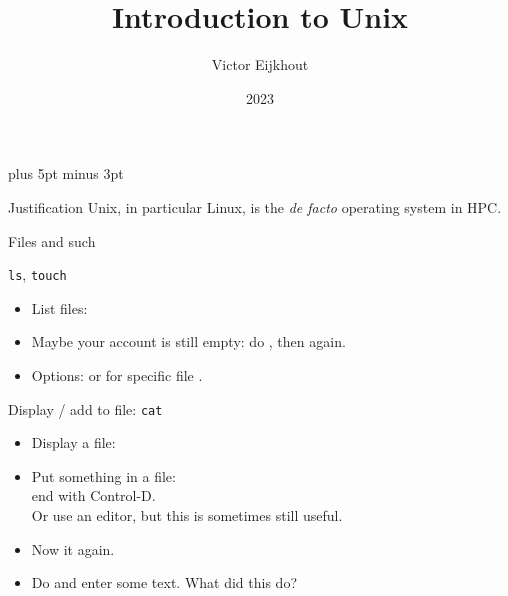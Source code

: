\documentclass[11pt,headernav]{beamer}
\begin{document}
\parskip=10pt plus 5pt minus 3pt

\title{Introduction to Unix}
\author{Victor Eijkhout}
\date{2023}

\begin{frame}
  \titlepage
\end{frame}

\tocslide

\begin{numberedframe}{Justification}
  Unix, in particular Linux, is the \textsl{de facto}
  operating system in \ac{HPC}.
\end{numberedframe}

 {Files and such}

\begin{numberedframe}{\texttt{ls}, \texttt{touch}}
  \label{sl-lnx:ls}
  \begin{itemize}
  \item List files: 
  \item Maybe your account is still empty: do ,
    then  again.
  \item Options:  or for specific file .
  \end{itemize}
\end{numberedframe}



\begin{numberedframe}{Display / add to file: \texttt{cat}}
  \label{sl-lnx:cat}
  \begin{itemize}
  \item Display a file: 
  \item Put something in a file: \\
    end with Control-D.\\
    Or use an editor, but this is sometimes still useful.
  \item Now  it again.
  \item Do  and enter some text.
    What did this do?
  \end{itemize}
\end{numberedframe}
\end{document}
